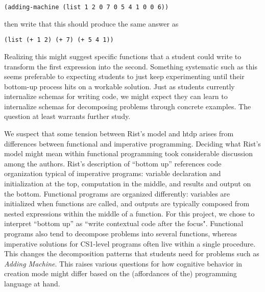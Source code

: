 \documentclass{sig-alternate-05-2015}
\newcommand{\htdp}{{\sc htdp}\xspace}
\def\problemName#1{\emph{#1}\xspace}
\def\Adding{\problemName{Adding Machine}}
\begin{document}
\lstinline{(adding-machine (list 1 2 0 7 0 5 4 1 0 0 6))}

\noindent
then write that this should produce the same answer as

\lstinline{(list (+ 1 2) (+ 7) (+ 5 4 1))}

\noindent
Realizing this might suggest specific functions that a student could write to transform the first expression into the second.  Something systematic such as this seems preferable to expecting students to just keep experimenting until their bottom-up process hits on a workable solution.  Just as students currently internalize schemas for writing code, we might expect they can learn to internalize schemas for decomposing problems through concrete examples.  The question at least warrants further study.

We suspect that some tension between Rist's model and \htdp arises from differences between functional and imperative programming.  
Deciding what Rist's model might mean within functional programming took considerable discussion among the authors.  Rist's description of ``bottom up'' references code organization typical of imperative programs: variable declaration and initialization at the top, computation in the middle, and results and output on the bottom.  Functional programs are organized differently: variables are initialized when functions are called, and outputs are typically composed from nested expressions within the middle of a function.  For this project, we chose to interpret ``bottom up'' as ``write contextual code after the focus".  Functional programs also tend to decompose problems into several functions, whereas imperative solutions for CS1-level programs often live within a single procedure.  This changes the decomposition patterns that students need for problems such as \Adding.  This raises various questions for how cognitive behavior in creation mode might differ based on the (affordances of the) programming language at hand.

\end{document}
